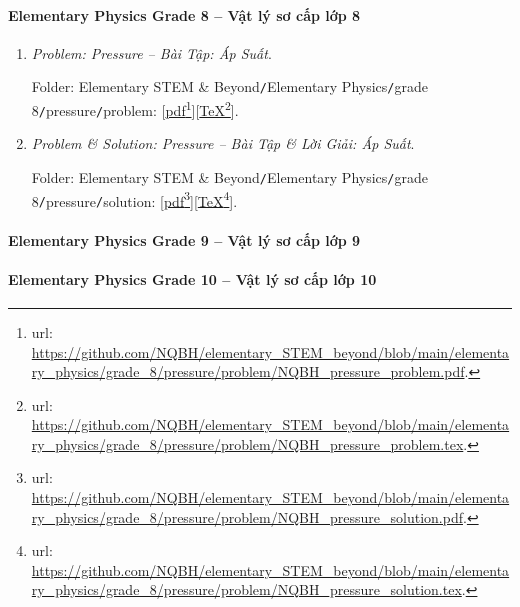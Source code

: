 \documentclass[12pt]{article}
\begin{document}
\paragraph{Elementary Physics Grade 8 -- Vật lý sơ cấp lớp 8}

\begin{enumerate}
	\item {\it Problem: Pressure -- Bài Tập: Áp Suất}.
	
	Folder: {\sf Elementary STEM \& Beyond{\tt/}Elementary Physics{\tt/}grade 8{\tt/}pressure{\tt/}problem}: [\href{https://github.com/NQBH/elementary_STEM_beyond/blob/main/elementary_physics/grade_8/pressure/problem/NQBH_pressure_problem.pdf}{pdf}\footnote{{\sc url}: \url{https://github.com/NQBH/elementary_STEM_beyond/blob/main/elementary_physics/grade_8/pressure/problem/NQBH_pressure_problem.pdf}.}][\href{https://github.com/NQBH/elementary_STEM_beyond/blob/main/elementary_physics/grade_8/pressure/problem/NQBH_pressure_problem.tex}{\TeX}\footnote{{\sc url}: \url{https://github.com/NQBH/elementary_STEM_beyond/blob/main/elementary_physics/grade_8/pressure/problem/NQBH_pressure_problem.tex}.}].
	\item {\it Problem \& Solution: Pressure -- Bài Tập \& Lời Giải: Áp Suất}.
	
	Folder: {\sf Elementary STEM \& Beyond{\tt/}Elementary Physics{\tt/}grade 8{\tt/}pressure{\tt/}solution}: [\href{https://github.com/NQBH/elementary_STEM_beyond/blob/main/elementary_physics/grade_8/pressure/problem/NQBH_pressure_solution.pdf}{pdf}\footnote{{\sc url}: \url{https://github.com/NQBH/elementary_STEM_beyond/blob/main/elementary_physics/grade_8/pressure/problem/NQBH_pressure_solution.pdf}.}][\href{https://github.com/NQBH/elementary_STEM_beyond/blob/main/elementary_physics/grade_8/pressure/problem/NQBH_pressure_solution.tex}{\TeX}\footnote{{\sc url}: \url{https://github.com/NQBH/elementary_STEM_beyond/blob/main/elementary_physics/grade_8/pressure/problem/NQBH_pressure_solution.tex}.}].
\end{enumerate}

\paragraph{Elementary Physics Grade 9 -- Vật lý sơ cấp lớp 9}

\paragraph{Elementary Physics Grade 10 -- Vật lý sơ cấp lớp 10}
\end{document}
